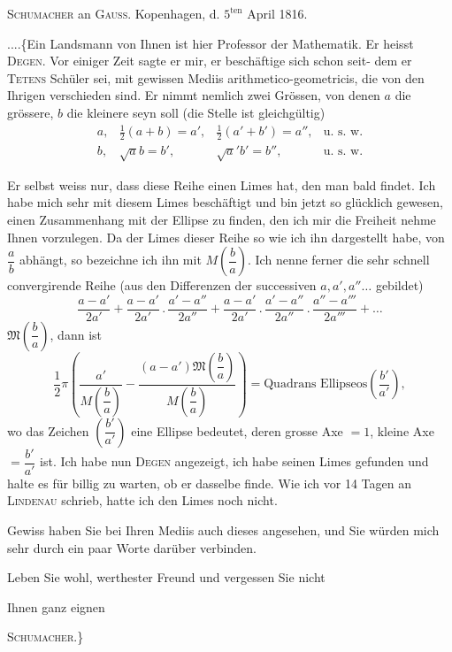 \begingroup
{}
\begin{center}\textsc{Schumacher} an \textsc{Gauss}. Kopenhagen, d. $5^{\mathrm{ten}}$ April 1816.\end{center}
\noindent .\enspace .\enspace .\enspace .\quad \{Ein Landsmann von Ihnen ist hier Professor der Mathematik. Er heisst \textsc{Degen}. Vor einiger Zeit sagte er mir, er beschäftige sich schon seit-
\clearpage
{}
\noindent dem er \textsc{Tetens} Schüler sei, mit gewissen Mediis arithmetico-geometricis, die von den Ihrigen verschieden sind. Er nimmt nemlich zwei Grössen, von denen $a$ die grössere, $b$ die kleinere seyn soll (die Stelle ist gleichgültig)
\[
\begin{array}{llll}
a,&\tfrac12(a+b)=a',&\tfrac12(a'+b')=a'',&\text{u. s. w.}\\[4pt]
b,&\surd ab=b',&\surd a'b'=b'',&\text{u. s. w.}
\end{array}
\]
\par\indent Er selbst weiss nur, dass diese Reihe einen Limes hat, den man bald findet. Ich habe mich sehr mit diesem Limes beschäftigt und bin jetzt so glücklich gewesen, einen Zusammenhang mit der Ellipse zu finden, den ich mir die Freiheit nehme Ihnen vorzulegen. Da der Limes dieser Reihe so wie ich ihn dargestellt habe, von $\dfrac{a}{b}$ abhängt, so bezeichne ich ihn mit $M\left(\dfrac{b}{a}\right)$. Ich nenne ferner die sehr schnell convergirende Reihe (aus den Differenzen der successiven $a,a',a''\ldots$ gebildet)
\[
\frac{a-a'}{2a'}+\frac{a-a'}{2a'}\, .\,\frac{a'-a''}{2a''}
+\frac{a-a'}{2a'}\, .\,\frac{a'-a''}{2a''}\, .\,\frac{a''-a'''}{2a'''}+\ldots
\]
\noindent $\mathfrak{M}\left(\dfrac{b}{a}\right)$, dann ist
\[
\frac12\pi\left(\frac{a'}{M\left(\dfrac{b}{a}\right)}-\frac{(a-a')\mathfrak{M}\left(\dfrac{b}{a}\right)}{M\left(\dfrac{b}{a}\right)}\right)
=\text{Quadrans Ellipseos}\left(\frac{b'}{a'}\right),
\]
\noindent wo das Zeichen $\left(\dfrac{b'}{a'}\right)$ eine Ellipse bedeutet, deren grosse Axe $=1$, kleine Axe $=\dfrac{b'}{a'}$ ist. Ich habe nun \textsc{Degen} angezeigt, ich habe seinen Limes gefunden und halte es für billig zu warten, ob er dasselbe finde. Wie ich vor 14 Tagen an \textsc{Lindenau} schrieb, hatte ich den Limes noch nicht.

\par\indent Gewiss haben Sie bei Ihren Mediis auch dieses angesehen, und Sie würden mich sehr durch ein paar Worte darüber verbinden.

\par\indent Leben Sie wohl, werthester Freund und vergessen Sie nicht
\begin{flushright}Ihnen ganz eignen\par\medskip\textsc{Schumacher.}\}\end{flushright}
\clearpage
\endgroup
